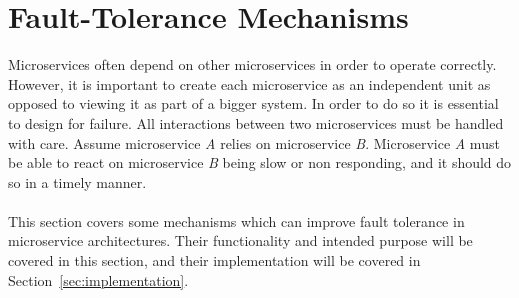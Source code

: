 \section{Fault-Tolerance Mechanisms}\label{sec:mechanisms}
Microservices often depend on other microservices in order to
operate correctly. However, it is important to create each
microservice as an independent unit as opposed to viewing it as part
of a bigger system. In order to do so it is essential to design for
failure. All interactions between two microservices must be handled
with care. Assume microservice \emph{A} relies on microservice
\emph{B}. Microservice \emph{A} must be able to react on microservice
\emph{B} being slow or non responding, and it should do so in a timely
manner.
\\\\
This section covers some mechanisms which can improve fault tolerance in
microservice architectures. Their functionality and intended purpose will
be covered in this section, and their implementation will be covered in 
Section~\ref{sec:implementation}.

